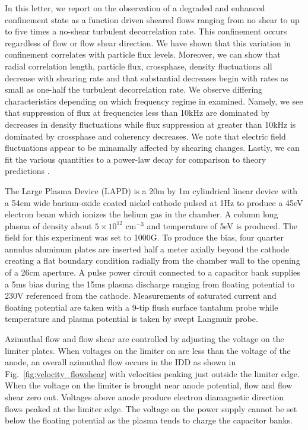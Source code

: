\documentclass[%
 aps,
 prl,
 amsmath,amssymb,
 reprint,%
]{revtex4-1}
\begin{document}
In this letter, we report on the observation of a degraded and enhanced confinement state as a function driven sheared flows ranging from no shear to up to five times a no-shear turbulent decorrelation rate. This confinement occurs regardless of flow or flow shear direction. We have shown that this variation in confinement correlates with particle flux levels. Moreover, we can show that radial correlation length, particle flux, crossphase, density fluctuations all decrease with shearing rate and that substantial decreases begin with rates as small as one-half the turbulent decorrelation rate. We observe differing characteristics depending on which frequency regime in examined. Namely, we see that suppression of flux at frequencies less than 10kHz are dominated by decreases in density fluctuations while flux suppression at greater than 10kHz is dominated by crossphase and coherency decreases. We note that electric field fluctuations appear to be minamally affected by shearing changes. Lastly, we can fit the various quantities to a power-law decay for comparison to theory predictions \cite{biglari90}.

The Large Plasma Device \cite{gek91} (LAPD) is a 20m by 1m cylindrical linear device with a 54cm wide barium-oxide coated nickel cathode pulsed at 1Hz to produce a 45eV electron beam which ionizes the helium gas in the chamber. A column long plasma of density about $5 \times 10^{12}$ cm$^{-3}$ and temperature of 5eV is produced. The field for this experiment was set to 1000G. To produce the bias, four quarter annulus aluminum plates are inserted half a meter axially beyond the cathode creating a flat boundary condition radially from the chamber wall to the opening of a 26cm aperture. A pulse power circuit connected to a capacitor bank supplies a 5ms bias during the 15ms plasma discharge ranging from floating potential to 230V referenced from the cathode. Measurements of saturated current and floating potential are taken with a 9-tip flush surface tantalum probe while temperature and plasma potential is taken by swept Langmuir probe.

Azimuthal flow and flow shear are controlled by adjusting the voltage on the limiter plates. When voltages on the limiter on are less than the voltage of the anode, an overall azimuthal flow occurs in the IDD as shown in
Fig.~\ref{fig:velocity_flowshear}
with velocities peaking just outside the limiter edge. When the voltage on the limiter is brought near anode potential, flow and flow shear zero out. Voltages above anode produce electron diamagnetic direction flows peaked at the limiter edge. The voltage on the power supply cannot be set below the floating potential as the plasma tends to charge the capacitor banks.
\end{document}
